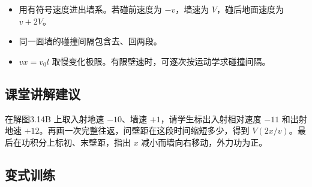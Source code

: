 \documentclass[UTF8,fontset=fandol,a4paper,11pt]{ctexart}
\begin{document}
\begin{itemize}
\item 用有符号速度进出墙系。若碰前速度为 $-v$，墙速为 $V$，碰后地面速度为 $v+2V$。
\item 同一面墙的碰撞间隔包含去、回两段。
\item $vx=v_0l$ 取慢变化极限。有限壁速时，可逐次按运动学求碰撞间隔。
\end{itemize}



\subsection*{课堂讲解建议}

在解图3.14B 上取入射地速 $-10$、墙速 $+1$，请学生标出入射相对速度 $-11$ 和出射地速 $+12$。再画一次完整往返，问壁距在这段时间缩短多少，得到 $V(2x/v)$。最后在功积分上标初、末壁距，指出 $x$ 减小而墙向右移动，外力功为正。



\subsection*{变式训练}
\end{document}
